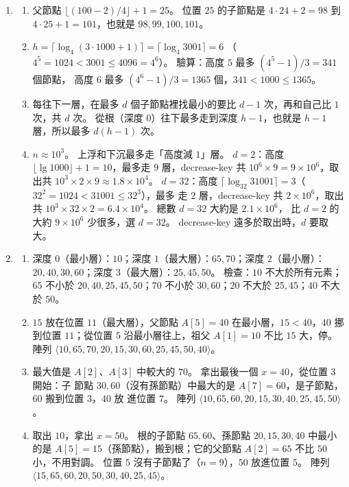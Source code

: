 \begin{enumerate}
\item
\begin{enumerate}
\item 父節點 $\lfloor (100 - 2)/4 \rfloor + 1 = 25$。 位置 $25$ 的子節點是
$4 \cdot 24 + 2 = 98$ 到 $4 \cdot 25 + 1 = 101$，也就是 $98, 99, 100, 101$。
\item $h = \lceil \log_4(3 \cdot 1000 + 1) \rceil = \lceil \log_4 3001 \rceil = 6$
（$4^5 = 1024 < 3001 \le 4096 = 4^6$）。 驗算：高度 $5$ 最多 $(4^5 - 1)/3 = 341$ 個節點，
高度 $6$ 最多 $(4^6 - 1)/3 = 1365$ 個，$341 < 1000 \le 1365$。
\item 每往下一層，在最多 $d$ 個子節點裡找最小的要比 $d - 1$ 次，再和自己比 $1$ 次，共
$d$ 次。 從根（深度 $0$）往下最多走到深度 $h - 1$，也就是 $h - 1$ 層，所以最多
$d(h - 1)$ 次。
\item $n \approx 10^3$。 上浮和下沉最多走「高度減 $1$」層。 $d = 2$：高度
$\lfloor \lg 1000 \rfloor + 1 = 10$，最多走 $9$ 層，decrease-key 共
$10^6 \times 9 = 9 \times 10^6$，取出共 $10^3 \times 2 \times 9 \approx 1.8 \times 10^4$。
$d = 32$：高度 $\lceil \log_{32} 31001 \rceil = 3$（$32^2 = 1024 < 31001 \le 32^3$），最多
走 $2$ 層，decrease-key 共 $2 \times 10^6$，取出共
$10^3 \times 32 \times 2 = 6.4 \times 10^4$。 總數 $d = 32$ 大約是 $2.1 \times 10^6$，
比 $d = 2$ 的大約 $9 \times 10^6$ 少很多，選 $d = 32$。 decrease-key 遠多於取出時，$d$ 要取大。
\end{enumerate}

\item
\begin{enumerate}
\item 深度 $0$（最小層）：$10$；深度 $1$（最大層）：$65, 70$；深度 $2$（最小層）：$20,
40, 30, 60$；深度 $3$（最大層）：$25, 45, 50$。 檢查：$10$ 不大於所有元素；$65$ 不小於
$20, 40, 25, 45, 50$；$70$ 不小於 $30, 60$；$20$ 不大於 $25, 45$；$40$ 不大於 $50$。
\item $15$ 放在位置 $11$（最大層），父節點 $A[5] = 40$ 在最小層，$15 < 40$，$40$ 挪到位置
$11$；從位置 $5$ 沿最小層往上，祖父 $A[1] = 10$ 不比 $15$ 大，停。 陣列
$\langle 10, 65, 70, 20, 15, 30, 60, 25, 45, 50, 40 \rangle$。
\item 最大值是 $A[2]$、$A[3]$ 中較大的 $70$。 拿出最後一個 $x = 40$，從位置 $3$ 開始：子
節點 $30, 60$（沒有孫節點）中最大的是 $A[7] = 60$，是子節點，$60$ 搬到位置 $3$，$40$ 放
進位置 $7$。 陣列 $\langle 10, 65, 60, 20, 15, 30, 40, 25, 45, 50 \rangle$。
\item 取出 $10$，拿出 $x = 50$。 根的子節點 $65, 60$、孫節點 $20, 15, 30, 40$ 中最小的是
$A[5] = 15$（孫節點），搬到根；它的父節點 $A[2] = 65$ 不比 $50$ 小，不用對調。 位置 $5$
沒有子節點了（$n = 9$），$50$ 放進位置 $5$。 陣列
$\langle 15, 65, 60, 20, 50, 30, 40, 25, 45 \rangle$。
\end{enumerate}


\end{enumerate}
